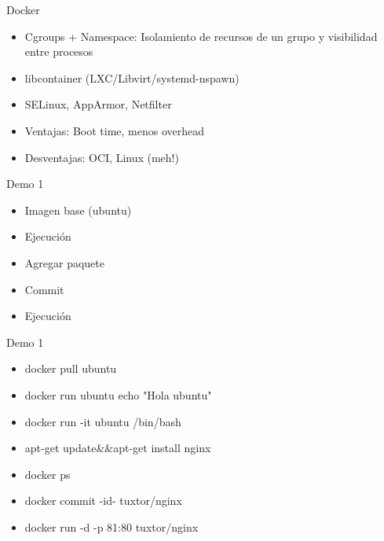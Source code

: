 \documentclass[aspectratio=169]{beamer}
\begin{document}
\begin{frame}{Docker}
    \begin{itemize}
        \item Cgroups + Namespace: Isolamiento de recursos de un grupo y visibilidad entre procesos
        \item libcontainer (LXC/Libvirt/systemd-nspawn)
        \item SELinux, AppArmor, Netfilter
        \pause\item Ventajas: Boot time, menos overhead
        \pause\item Desventajas: OCI, Linux \pause (meh!)
    \end{itemize}
\end{frame}


\begin{frame}{Demo 1}
    \begin{itemize}
        \item Imagen base (ubuntu)
        \item Ejecución
        \item Agregar paquete
        \item Commit
        \item Ejecución
    \end{itemize}
\end{frame}

\begin{frame}{Demo 1}
    \begin{itemize}
        \item docker pull ubuntu
        \item docker run ubuntu echo "Hola ubuntu"
        \item docker run -it ubuntu /bin/bash
        \item apt-get update\&\&apt-get install nginx
        \item docker ps
        \item docker commit -id- tuxtor/nginx
        \item docker run -d -p 81:80 tuxtor/nginx
    \end{itemize}
\end{frame} 
\end{document}
